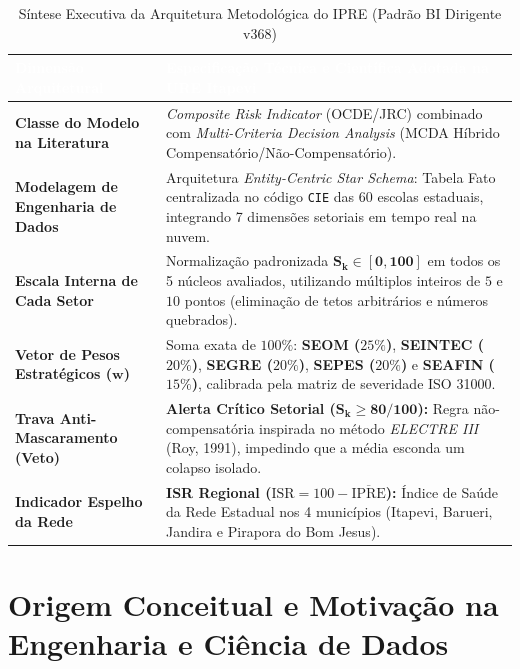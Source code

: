 \documentclass[9pt,a4paper]{extarticle}
\begin{document}
\begin{table}[htbp]
\centering
\small
\renewcommand{\arraystretch}{1.24}
\caption{Síntese Executiva da Arquitetura Metodológica do IPRE (Padrão BI Dirigente v368)}
\begin{tabularx}{\textwidth}{>{\bfseries\color{ureNavy}}p{4.3cm} X}
\toprule
\rowcolor{ureNavy} \textcolor{white}{Dimensão Arquitetural} & \textcolor{white}{\textbf{Especificação Técnica e Científica Adotada na URE Itapevi}} \\
\midrule
Classe do Modelo na Literatura & \emph{Composite Risk Indicator} (OCDE/JRC) combinado com \emph{Multi-Criteria Decision Analysis} (MCDA Híbrido Compensatório/Não-Compensatório). \\
\rowcolor{ureLight} Modelagem de Engenharia de Dados & Arquitetura \emph{Entity-Centric Star Schema}: Tabela Fato centralizada no código \texttt{CIE} das 60 escolas estaduais, integrando 7 dimensões setoriais em tempo real na nuvem. \\
Escala Interna de Cada Setor & Normalização padronizada $\mathbf{S_k \in [0, 100]}$ em todos os 5 núcleos avaliados, utilizando múltiplos inteiros de $5$ e $10$ pontos (eliminação de tetos arbitrários e números quebrados). \\
\rowcolor{ureLight} Vetor de Pesos Estratégicos ($\mathbf{w}$) & Soma exata de $100\%$: \textbf{SEOM ($25\%$)}, \textbf{SEINTEC ($20\%$)}, \textbf{SEGRE ($20\%$)}, \textbf{SEPES ($20\%$)} e \textbf{SEAFIN ($15\%$)}, calibrada pela matriz de severidade ISO 31000. \\
Trava Anti-Mascaramento (Veto) & \textbf{Alerta Crítico Setorial ($\mathbf{S_k \ge 80/100}$):} Regra não-compensatória inspirada no método \emph{ELECTRE III} (Roy, 1991), impedindo que a média esconda um colapso isolado. \\
\rowcolor{ureLight} Indicador Espelho da Rede & \textbf{ISR Regional ($\text{ISR} = 100 - \overline{\text{IPRE}}$):} Índice de Saúde da Rede Estadual nos 4 municípios (Itapevi, Barueri, Jandira e Pirapora do Bom Jesus). \\
\bottomrule
\end{tabularx}
\end{table}

\section{Origem Conceitual e Motivação na Engenharia e Ciência de Dados}
\end{document}
